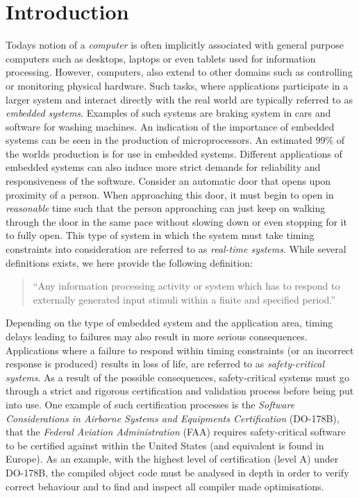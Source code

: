 \chapter{Introduction}
\label{chapter:introduction}
Todays notion of a \textit{computer} is often implicitly associated with general purpose computers such as desktops, laptops or even tablets used for information processing. However, computers, also extend to other domains such as controlling or monitoring physical hardware. Such tasks, where applications participate in a larger system and interact directly with the real world are typically referred to as \textit{embedded systems}. Examples of such systems are braking system in cars and software for washing machines. An indication of the importance of embedded systems can be seen in the production of microprocessors. An estimated 99\% of the worlds production is for use in embedded systems\cite{alan2001real}. Different applications of embedded systems can also induce more strict demands for reliability and responsiveness of the software. Consider an automatic door that opens upon proximity of a person. When approaching this door, it must begin to open in \textit{reasonable} time such that the person approaching can just keep on walking through the door in the same pace without slowing down or even stopping for it to fully open. This type of system in which the system must take timing constraints into consideration are referred to as \textit{real-time systems}. While several definitions exists, we here provide the following definition:

\begin{quotation}
``Any information processing activity or system which has to respond to externally generated input stimuli within a finite and specified period.''~\cite{alan2001real}
\end{quotation}

Depending on the type of embedded system and the application area, timing delays leading to failures may also result in more serious consequences. Applications where a failure to respond within timing constraints (or an incorrect response is produced) results in loss of life, are referred to as \textit{safety-critical systems}\cite{SCJSpec}. As a result of the possible consequences, safety-critical systems must go through a strict and rigorous certification and validation process before being put into use. One example of such certification processes is the \textit{Software Considerations in Airborne Systems and Equipments Certification} (DO-178B)\cite{DO178B}, that the \textit{Federal Aviation Administration} (FAA) requires safety-critical software to be certified against within the United States (and equivalent is found in Europe). As an example, with the highest level of certification (level A) under DO-178B, the compiled object code must be analysed in depth in order to verify correct behaviour and to find and inspect all compiler made optimisations\cite{DO178B-Example}.

